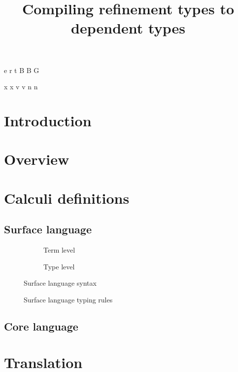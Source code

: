 \documentclass[a4paper]{article}
\begin{document}
\newnonterm e \varepsilon
\newnonterm r \rho
\newnonterm t \tau
\newnonterm B B
\newnonterm G \Gamma
{}

\newgterm x x
\newgterm v v
\newgterm n n


\title{Compiling refinement types to dependent types}

\maketitle

\section{Introduction}

\section{Overview}

\section{Calculi definitions}

\subsection{Surface language}

\begin{figure}[ht]
  \footnotesize
  \begin{subfigure}{.6\textwidth}
	\caption{Term level}
  \end{subfigure}
  \begin{subfigure}{.5\textwidth}
	\caption{Type level}
  \end{subfigure}
  \caption{Surface language syntax}
  \label{fig:surface_syntax}
\end{figure}

\begin{figure}[ht]
  \footnotesize
  \caption{Surface language typing rules}
  \label{fig:surface_typing}
\end{figure}

\subsection{Core language}

\section{Translation}
\end{document}
